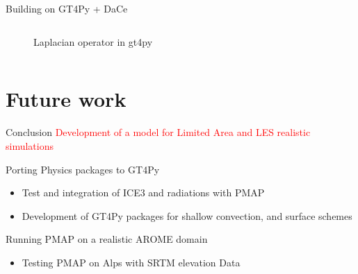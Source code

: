 \documentclass[10pt]{beamer}
\begin{document}
\begin{frame}{Building on GT4Py + DaCe}
\begin{columns}[t]
        \begin{column}{0.3\textwidth}
            \begin{figure}
            \caption{Laplacian operator in gt4py}
            \label{fig:code_sample}
            \end{figure}
    \end{column}
    \end{columns}
\end{frame}


\section{Future work}


\begin{frame}{Conclusion}
        \textcolor{red}{Development of a model for Limited Area and LES realistic simulations}
        \begin{block}{Porting Physics packages to GT4Py}
            \begin{itemize}
                \item Test and integration of ICE3 and radiations with PMAP
                \item Development of GT4Py packages for shallow convection, and surface schemes 
            \end{itemize}
        \end{block}
    
        \begin{block}{Running PMAP on a realistic AROME domain}
            \begin{itemize}
                \item Testing PMAP on Alps with SRTM elevation Data
            \end{itemize}
        \end{block}
    
        \begin{block}{}
        \end{block}
\end{frame}
\end{document}
